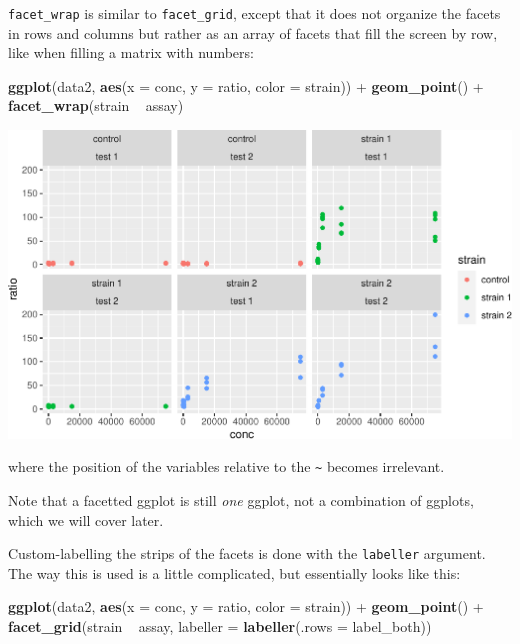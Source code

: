 \documentclass[]{book}
\newenvironment{Shaded}{}{}
\newcommand{\DataTypeTok}[1]{\textcolor[rgb]{0.56,0.13,0.00}{#1}}
\newcommand{\KeywordTok}[1]{\textcolor[rgb]{0.00,0.44,0.13}{\textbf{#1}}}
\newcommand{\NormalTok}[1]{#1}
\newcommand{\OperatorTok}[1]{\textcolor[rgb]{0.40,0.40,0.40}{#1}}
\newcommand{\StringTok}[1]{\textcolor[rgb]{0.25,0.44,0.63}{#1}}
\begin{document}
\texttt{facet\_wrap} is similar to \texttt{facet\_grid}, except that it does not organize the facets in rows and columns but rather as an array of facets that fill the screen by row, like when filling a matrix with numbers:

\begin{Shaded}
\begin{Highlighting}[]
\KeywordTok{ggplot}\NormalTok{(data2, }\KeywordTok{aes}\NormalTok{(}\DataTypeTok{x =}\NormalTok{ conc, }\DataTypeTok{y =}\NormalTok{ ratio, }\DataTypeTok{color =}\NormalTok{ strain)) }\OperatorTok{+}
\StringTok{  }\KeywordTok{geom_point}\NormalTok{() }\OperatorTok{+}
\StringTok{  }\KeywordTok{facet_wrap}\NormalTok{(strain }\OperatorTok{~}\StringTok{ }\NormalTok{assay)}
\end{Highlighting}
\end{Shaded}

\begin{center}\includegraphics[width=\textwidth]{TRES-Tidy-Tutorial_files/figure-latex/unnamed-chunk-133-1} \end{center}

where the position of the variables relative to the \texttt{\textasciitilde{}} becomes irrelevant.

Note that a facetted ggplot is still \emph{one} ggplot, not a combination of ggplots, which we will cover later.

Custom-labelling the strips of the facets is done with the \texttt{labeller} argument. The way this is used is a little complicated, but essentially looks like this:

\begin{Shaded}
\begin{Highlighting}[]
\KeywordTok{ggplot}\NormalTok{(data2, }\KeywordTok{aes}\NormalTok{(}\DataTypeTok{x =}\NormalTok{ conc, }\DataTypeTok{y =}\NormalTok{ ratio, }\DataTypeTok{color =}\NormalTok{ strain)) }\OperatorTok{+}
\StringTok{  }\KeywordTok{geom_point}\NormalTok{() }\OperatorTok{+}
\StringTok{  }\KeywordTok{facet_grid}\NormalTok{(strain }\OperatorTok{~}\StringTok{ }\NormalTok{assay, }\DataTypeTok{labeller =} \KeywordTok{labeller}\NormalTok{(}\DataTypeTok{.rows =}\NormalTok{ label_both))}
\end{Highlighting}
\end{Shaded}
\end{document}
